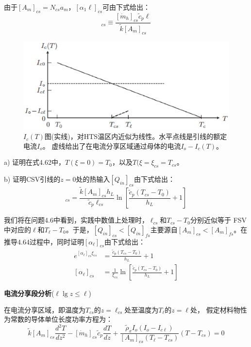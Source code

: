 由于$[A_m]_{cs}=N_{cs}a_m$，$[\alpha_{1}\ell]_{cs}$可由下式给出：
\begin{equation}%
[\alpha_\ell]_{cs}\equiv\frac{[\dot{m}_h]_{cs}\tilde{c}_p\ell}{\tilde{k}[A_m]_{cs}}
\end{equation}

\begin{figure}[htbp]
	\centering
	\includegraphics[scale=0.7]{chpt4/figs/fig4.22.eps}
	\caption{$I_c(T)$图(实线)，对HTS温区内近似为线性。水平点线是引线的额定电流$I_o$。
		虚线给出了在电流分享区域通过母体的电流$I_o-I_c(T)$。}
\end{figure}

a) 证明在式4.62中，$T(\xi=0)=T_0$，以及$T(\xi=\xi_{cs}=T_{cs}$。
	
b) 证明CSV引线的$z=0$处的热输入$[Q_{in}]_{cs}$由下式给出：
\begin{equation}%
[Q_{in}]_{cs}=\frac{\tilde{k}[A_m]_{cs}h_L}{\tilde{c}_p\ell_{cs}}\ln\left[\frac{\tilde{c}_p(T_{cs}-T_0)}{h_L}+1\right]
\end{equation}

我们将在问题4.6中看到，实践中数值上处理时，$\ell_{cs}$和$T_{cs}−T_0$分别近似等于
FSV中对应的$\ell$和$T_\ell−T_0$。于是，$[Q_{in}]_{cs}<[Q_{in}]_{fs}$主要源自$[A_m]_{cs} < [A_m]_{fs}$。在推导4.64过程中，同时证明$[\alpha_\ell]_{cs}$由下式给出：
\begin{subequations}
	\begin{align*}
e^{[\alpha_\ell]_{cs}\xi_{cs}}&=\frac{\tilde{c}_p(T_{cs}-T_0)}{h_L}+1\\
[\alpha_\ell]_{cs}&=\frac{1}{\xi_{cs}}\ln\left[\frac{\tilde{c}_p(T_{cs}-T_0)}{h_L}+1\right]
	\end{align*}
\end{subequations}

\textbf{电流分享段分析}($\ell\lg z\le \ell$)

在电流分享区域，即温度为$T_{cs}$的$z=\ell_{cs}$处至温度为$T_\ell$的$z=\ell$处，
假定材料物性为常数的导体单位长度功率方程为：
\begin{equation}%
\tilde{k}[A_m]_{cs}\frac{d^2T}{dz^2}-[\dot{m}_h]_{cs}\tilde{c}_p\frac{dT}{dz}+\frac{\tilde{\rho}_xI_o(I_o-I_{c\ell})}{[A_m]_{cs}(T_\ell-T_{cs})}(T-T_{cs})=0
\end{equation}

